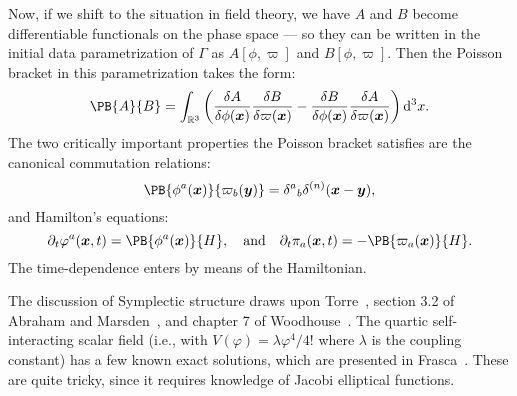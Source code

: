 Now, if we shift to the situation in field theory, we have $A$ and $B$
become differentiable functionals on the phase space --- so they can be
written in the initial data parametrization of $\Gamma$ as $A[\phi,\varpi]$
and $B[\phi,\varpi]$. Then the Poisson bracket in this parametrization
takes the form:
\begin{equation}
\PB{A}{B} = \int_{\RR^{3}}\left(
\frac{\delta A}{\delta\phi(\vec{x})}\frac{\delta B}{\delta\varpi(\vec{x})}
-\frac{\delta B}{\delta\phi(\vec{x})}\frac{\delta A}{\delta\varpi(\vec{x})}
\right)\D^{3}x.
\end{equation}
The two critically important properties the Poisson bracket satisfies
are the canonical commutation relations:
\begin{equation}
\PB{\phi^{a}(\vec{x})}{\varpi_{b}(\vec{y})}={\delta^{a}}_{b}\delta^{(n)}(\vec{x}-\vec{y}),
\end{equation}
and Hamilton's equations:
\begin{equation}
\partial_{t}\varphi^{a}(\vec{x},t)=\PB{\phi^{a}(\vec{x})}{H},\quad\mbox{and}\quad
\partial_{t}\pi_{a}(\vec{x},t)=-\PB{\varpi_{a}(\vec{x})}{H}.
\end{equation}
The time-dependence enters by means of the Hamiltonian.



The discussion of Symplectic structure draws upon
Torre~\cite{Torre:2022}, section 3.2 of Abraham and Marsden~\cite{Abraham:1978},
and chapter 7 of Woodhouse~\cite{Woodhouse:1992de}.
The quartic self-interacting scalar field (i.e., with
$V(\varphi)=\lambda\varphi^{4}/4!$ where $\lambda$ is the coupling
constant) has a few known exact solutions, which are presented in
Frasca~\cite{Frasca:2009bc}. These are quite tricky, since it requires
knowledge of Jacobi elliptical functions.
